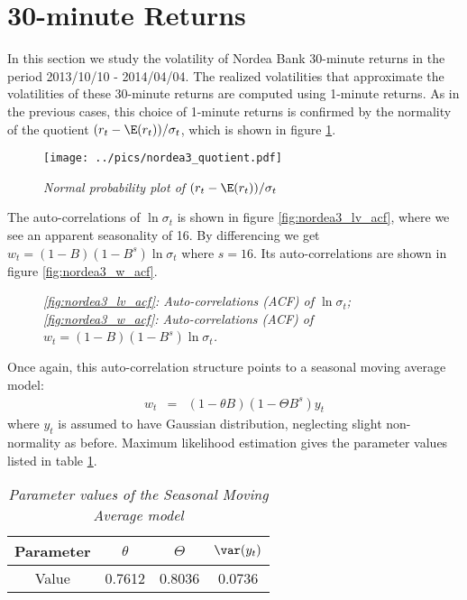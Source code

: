 \section{30-minute Returns}\label{sec:nordea2_30min}
In this section we study the volatility of Nordea Bank 30-minute
returns in the period 2013/10/10 - 2014/04/04. The realized
volatilities that approximate the volatilities of these 30-minute
returns are computed using 1-minute returns. As in the previous cases,
this choice of 1-minute returns is confirmed by the normality of the
quotient $(r_t - \E(r_t))/\sigma_t$, which is shown in figure
\ref{fig:nordea3_quotient}.
\begin{figure}[htb!]
  \centering
  \texttt{[image: ../pics/nordea3\_quotient.pdf]}
  \caption{\small \it Normal probability plot of $(r_t -
    \E(r_t))/\sigma_t$}
  \label{fig:nordea3_quotient}
\end{figure}
The auto-correlations of $\ln \sigma_t$ is shown in figure
\ref{fig:nordea3_lv_acf}, where we see an apparent seasonality of
16. By differencing we get $w_t = (1-B)(1-B^s)\ln\sigma_t$ where
$s=16$. Its auto-correlations are shown in figure
\ref{fig:nordea3_w_acf}.
\begin{figure}[htb!]
  \centering
  \caption{\small \it \ref{fig:nordea3_lv_acf}: Auto-correlations
    (ACF) of $\ln \sigma_t$; \ref{fig:nordea3_w_acf}: Auto-correlations
    (ACF) of $w_t = (1-B)(1-B^s)\ln\sigma_t$.}
\end{figure}
Once again, this auto-correlation structure
points to a seasonal moving average model:
\begin{eqnarray*}
  w_t &=& (1-\theta B)(1-\Theta B^s) y_t
\end{eqnarray*}
where $y_t$ is assumed to have Gaussian distribution, neglecting
slight non-normality as before. Maximum likelihood estimation gives
the parameter values listed in table \ref{tab:nordea3_sv_param}.
\begin{table}[htb!]
  \centering
  \begin{tabular}{|c|c|c|c|}
    \hline
    Parameter & $\theta$ & $\Theta$ & $\var(y_t)$\\
    \hline
    Value & 0.7612 & 0.8036 & 0.0736\\
    \hline
  \end{tabular}
  \caption{\small \it Parameter values of the Seasonal Moving Average
    model}
  \label{tab:nordea3_sv_param}
\end{table}

